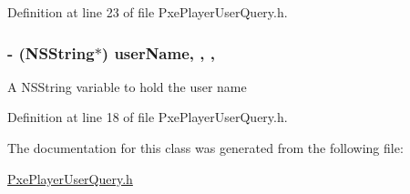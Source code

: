 Definition at line 23 of file Pxe\-Player\-User\-Query.\-h.

\hypertarget{interface_pxe_player_user_query_aeb08b5a0387096996db8cdd1195480ea}{
\subsubsection[{user\-Name}]{\setlength{\rightskip}{0pt plus 5cm}-\/ (N\-S\-String$\ast$) user\-Name\hspace{0.3cm}{\ttfamily [read]}, {\ttfamily [write]}, {\ttfamily [nonatomic]}, {\ttfamily [strong]}}}\label{interface_pxe_player_user_query_aeb08b5a0387096996db8cdd1195480ea}
A N\-S\-String variable to hold the user name 

Definition at line 18 of file Pxe\-Player\-User\-Query.\-h.



The documentation for this class was generated from the following file\-:\begin{DoxyCompactItemize}
\item 
\hyperlink{_pxe_player_user_query_8h}{Pxe\-Player\-User\-Query.\-h}\end{DoxyCompactItemize}
